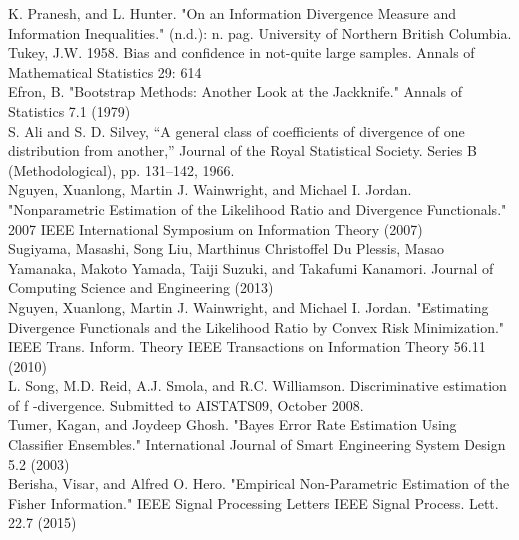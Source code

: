 \documentclass{article}
\begin{document}
	\noindent [8] K. Pranesh, and L. Hunter. "On an Information Divergence Measure and Information Inequalities." (n.d.): n. pag. University of Northern British Columbia. 
	\\ [0.5ex]
	
	\noindent [9] Tukey, J.W. 1958. Bias and confidence in not-quite large samples. Annals of Mathematical 
	\indent Statistics 29: 614
	\\ [0.5ex]
	
	\noindent [10] Efron, B. "Bootstrap Methods: Another Look at the Jackknife." Annals of Statistics 7.1 (1979)
	\\ [0.5ex]
	
	\noindent [19] S. Ali and S. D. Silvey, “A general class of coefficients of divergence of one distribution from 
	\indent another,” Journal of the Royal Statistical Society.
	Series B (Methodological), pp. 131–142, 1966.
	\\ [0.5ex]
	
	\noindent [20] Nguyen, Xuanlong, Martin J. Wainwright, and Michael I. Jordan. "Nonparametric Estimation 
	\indent of the Likelihood Ratio and Divergence Functionals." 2007 IEEE International Symposium on 
	\indent Information Theory (2007)
	\\ [0.5ex]

	\noindent [21] Sugiyama, Masashi, Song Liu, Marthinus Christoffel Du Plessis, Masao Yamanaka, Makoto 
	\indent Yamada, Taiji Suzuki, and Takafumi Kanamori. Journal of Computing Science and Engineering 
	 (2013)
	\\ [0.5ex]
	
	\noindent [22] Nguyen, Xuanlong, Martin J. Wainwright, and Michael I. Jordan. "Estimating Divergence
	\indent Functionals and the Likelihood Ratio by Convex Risk Minimization." IEEE Trans. Inform. 
	\indent Theory IEEE Transactions on Information Theory 56.11 (2010)
	\\ [0.5ex]

	\noindent [23] L. Song, M.D. Reid, A.J. Smola, and R.C. Williamson. Discriminative estimation of f -divergence. 
	\indent Submitted to AISTATS09, October 2008.
	\\ [0.5ex]
	
	\noindent [24] Tumer, Kagan, and Joydeep Ghosh. "Bayes Error Rate Estimation Using Classifier Ensembles." 
	\indent International Journal of Smart Engineering System Design 5.2 (2003)
	\\ [0.5ex]
	
	\noindent [25] Berisha, Visar, and Alfred O. Hero. "Empirical Non-Parametric Estimation of the Fisher 
	\indent Information." IEEE Signal Processing Letters IEEE Signal Process. Lett. 22.7 (2015)
	\\ [0.5ex]
	
\end{document}
